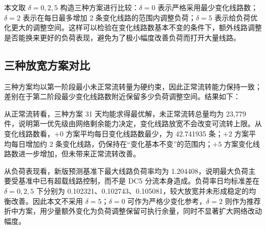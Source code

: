\documentclass[UTF8,zihao=-4,a4paper,fontset=fandol]{ctexart}
\begin{document}
本文取 $\delta=0,2,5$ 构造三种方案进行比较：$\delta=0$ 表示严格采用最少变化线路数；$\delta=2$ 表示在每日最多增加 2 条变化线路的范围内调整负荷；$\delta=5$ 表示给负荷优化更大的调整空间。这样可以检验在变化线路数基本不变的条件下，额外线路调整是否能换来更好的负荷表现，避免为了极小幅度改善负荷而打开大量线路。



\subsection{三种放宽方案对比}



三种方案均以第一阶段最小未正常流转量为硬约束，因此正常流转能力保持一致；差别在于第二阶段最少变化线路数附近保留多少负荷调整空间。结果如下：




\begin{table}[H]
  \centering
  \caption{问题二变化线路放宽方案对比}
  \label{tab:auto-6}
\end{table}




从正常流转看，三种方案 31 天均能求得最优解，未正常流转总量均为 23,779 件，说明第一优先级由网络剩余能力决定，变化线路放宽不会改变可流转上限。从变化线路数看，$+0$ 方案平均每日变化线路数最少，为 42.741935 条；$+2$ 方案平均每日增加约 2 条变化线路，仍保持在“变化基本不变”的范围内；$+5$ 方案变化线路数进一步增加，但未带来正常流转改善。



从负荷表现看，新版预测基准下最大线路负荷率均为 1.204408，说明最大负荷主要受基准中已有超载线路控制，而不是 DC5 分流本身造成。负荷率日均标准差在 $\delta=0,2,5$ 下分别为 0.102321、0.102743、0.105081，较大放宽并未形成稳定的均衡改善。因此本文不采用 $\delta=5$；$\delta=0$ 可作为严格少变化参考，$\delta=2$ 则作为推荐折中方案，用少量额外变化为负荷调整保留可执行余量，同时不显著扩大网络改动幅度。
\end{document}
